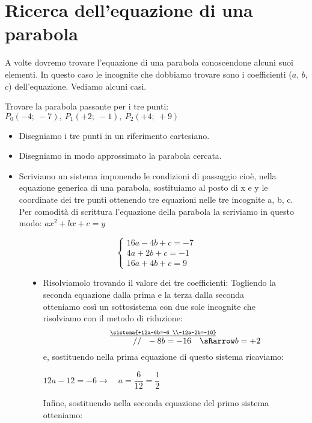 \section{Ricerca dell'equazione di una parabola}
\label{sec:parabola_altreparabole}

A volte dovremo trovare l'equazione di una parabola conoscendone alcuni suoi 
elementi. In questo caso le incognite che dobbiamo trovare sono i coefficienti 
(\(a\), \(b\), \(c\)) dell'equazione. Vediamo alcuni casi.

\begin{esempio}
 Trovare la parabola passante per i tre 
 punti:~\(P_0(-4;~-7),~ P_1(+2;~-1),~ P_2(+4;~+9)\)
 
 \begin{itemize}
  \item Disegniamo i tre punti in un riferimento cartesiano.
  \item Disegniamo in modo approssimato la parabola cercata.
  \item Scriviamo un sistema imponendo le condizioni di passaggio cioè, 
   nella equazione generica di una parabola, sostituiamo al posto di x e y 
   le coordinate dei tre punti ottenendo tre equazioni nelle tre 
   incognite a, b, c. Per comodità di scrittura l'equazione della parabola la 
   scriviamo in questo modo: \(ax^2+bx+c=y\)
 \end{itemize}
\begin{figure}[h]
\begin{minipage}{.60\textwidth}
\[\left\{\begin{array}{l}
  16a-4b+c=-7\\
  4a+2b+c=-1\\
  16a+4b+c=9
\end{array}\right. \]
 \begin{itemize}
  \item Risolviamolo trovando il valore dei tre coefficienti:
   Togliendo la seconda equazione dalla prima e la terza dalla seconda 
   otteniamo così un sottosistema con due sole incognite che risolviamo con 
   il metodo di riduzione:
\[\stackrel{\underline{\sistema{+12a-6b=-6 \\-12a-2b=-10}}}
  {\qquad \qquad \qquad ~~~~~~ // ~~ -8b =-16 \quad \sRarrow b=+2}\]
e, sostituendo nella prima equazione di questo sistema ricaviamo:

\(12a-12=-6 \rightarrow \quad a=\dfrac{6}{12}=\dfrac{1}{2}\)

Infine, sostituendo nella seconda equazione del primo sistema otteniamo:


\end{itemize}
\end{minipage}
\end{figure}
\end{esempio}
